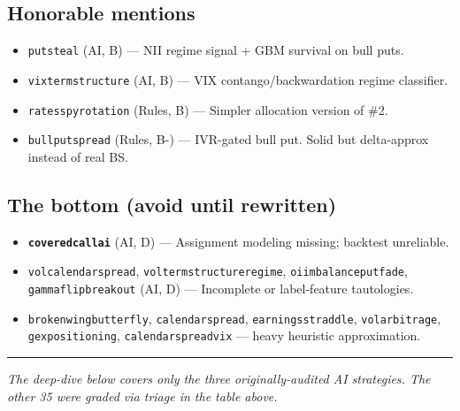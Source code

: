 \documentclass[11pt,a4paper]{article}
\newcommand{\verdictstop}[1]{\textcolor{bad}{\textbf{#1}}}
\begin{document}
\subsection*{Honorable mentions}
\begin{itemize}[leftmargin=*,itemsep=2pt]
  \item \texttt{put\textunderscore steal} (AI, B) --- NII regime signal + GBM survival on bull puts.
  \item \texttt{vix\textunderscore term\textunderscore structure} (AI, B) --- VIX contango/backwardation regime classifier.
  \item \texttt{rates\textunderscore spy\textunderscore rotation} (Rules, B) --- Simpler allocation version of \#2.
  \item \texttt{bull\textunderscore put\textunderscore spread} (Rules, B-) --- IVR-gated bull put. Solid but delta-approx instead of real BS.
\end{itemize}

\subsection*{The bottom (avoid until rewritten)}
\begin{itemize}[leftmargin=*,itemsep=2pt]
  \item \verdictstop{\texttt{covered\textunderscore call\textunderscore ai}} (AI, D) --- Assignment modeling missing; backtest unreliable.
  \item \texttt{vol\textunderscore calendar\textunderscore spread}, \texttt{vol\textunderscore term\textunderscore structure\textunderscore regime}, \texttt{oi\textunderscore imbalance\textunderscore put\textunderscore fade}, \texttt{gamma\textunderscore flip\textunderscore breakout} (AI, D) --- Incomplete or label-feature tautologies.
  \item \texttt{broken\textunderscore wing\textunderscore butterfly}, \texttt{calendar\textunderscore spread}, \texttt{earnings\textunderscore straddle}, \texttt{vol\textunderscore arbitrage}, \texttt{gex\textunderscore positioning}, \texttt{calendar\textunderscore spread\textunderscore vix} --- heavy heuristic approximation.
\end{itemize}

\vspace{12pt}
\hrule height 0.5pt
\vspace{8pt}
{\small\color{gray}\textit{The deep-dive below covers only the three originally-audited AI strategies. The other 35 were graded via triage in the table above.}}
\vspace{10pt}
\end{document}
